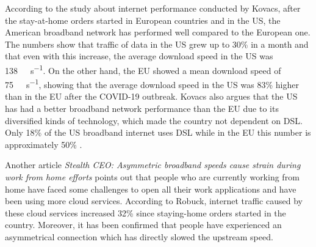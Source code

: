 \documentclass[conference,10pt]{IEEEtran}
\begin{document}





According to the study about internet performance conducted by Kovacs, after the stay-at-home orders started in European countries and in the US, the American broadband network has performed well compared to the European one. The numbers show that traffic of data in the US grew up to 30\% in a month and that even with this increase, the average download speed in the US was \SI{138}{\mega\bit\per\second}. On the other hand, the EU showed a mean download speed of \SI{75}{\mega\bit\per\second}, showing that the average download speed in the US was 83\% higher than in the EU after the COVID-19 outbreak. Kovacs also argues that the US has had a better broadband network performance than the EU due to its diversified kinds of technology, which made the country not dependent on DSL. Only 18\% of the US broadband internet uses DSL while in the EU this number is approximately 50\% \cite{kovacs}.

Another article \textit{Stealth CEO: Asymmetric broadband speeds cause strain during work from home efforts} \cite{robuck} points out that people who are currently working from home have faced some challenges to open all their work applications and have been using more cloud services. According to Robuck, internet traffic caused by these cloud services increased 32\% since staying-home orders started in the country. Moreover, it has been confirmed that people have experienced an asymmetrical connection which has directly slowed the upstream speed.
\end{document}
